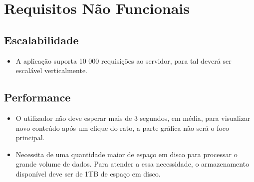 \section{Requisitos Não Funcionais}

\subsection{Escalabilidade}

\begin{itemize}
    \item A aplicação suporta 10 000 requisições ao servidor, para tal deverá ser escalável verticalmente.
\end{itemize}

\subsection{Performance}
\begin{itemize}
    \item  O utilizador não deve esperar mais de 3 segundos, em média, para visualizar novo conteúdo após um clique do rato, a parte gráfica não será o foco principal.
    \item Necessita de uma quantidade maior de espaço em disco para processar o grande volume de dados. Para atender a essa necessidade, o armazenamento disponível deve ser de 1TB de espaço em disco.
\end{itemize}


